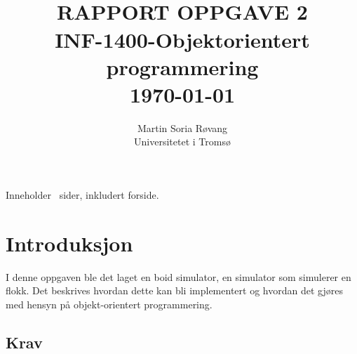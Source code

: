 




{\selectfont
\title{ \normalsize \textsc{}
		\\ [3.0cm] %
        \LARGE \textbf{\uppercase{Rapport Oppgave 2}
        \HRule{0.5pt} \\ [0.5cm]
        INF-1400-Objektorientert programmering
        \\
		\normalsize \today \vspace*{5\baselineskip}}
		}

        \date{}
\author{
		Martin Soria Røvang \\ 
        Universitetet i Tromsø \\}

\clearpage\maketitle
\vspace{0.2\textheight}
{\centering
Inneholder \pageref{LastPage} \, sider, inkludert forside.\par
}
\thispagestyle{empty}

\newpage
\tableofcontents


\newpage

\section{Introduksjon}
I denne oppgaven ble det laget en boid simulator, en simulator som simulerer en flokk. Det beskrives hvordan dette kan bli implementert og hvordan det gjøres med hensyn på objekt-orientert programmering.

\subsection{Krav}


}
